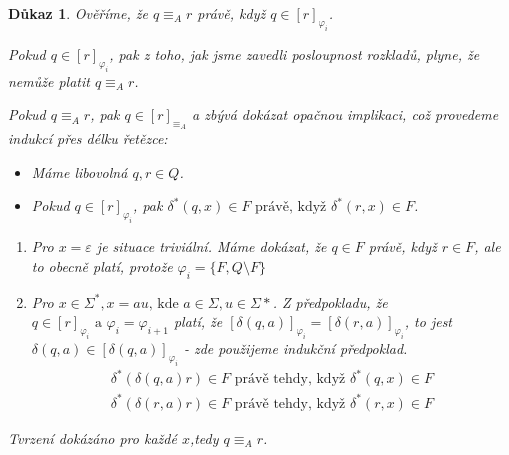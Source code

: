 \documentclass[10pt, a4paper, titlepage]{article}
\theoremstyle{note}
\newtheorem{dukaz}{Důkaz}
\begin{document}
\begin{dukaz}
Ověříme, že $q \equiv_{A} r$ právě, když $q \in [r]_{\varphi_{i}}$.

Pokud $q \in [r]_{\varphi_{i}}$, pak z toho, jak jsme zavedli
posloupnost rozkladů, plyne, že nemůže platit $q \equiv_{A} r$.

Pokud $q \equiv_{A} r$, pak $q \in [r]_{\equiv_{A}}$ a zbývá dokázat opačnou implikaci, což provedeme indukcí přes délku řetězce:
\begin{itemize}
\item
Máme libovolná $q, r \in Q$.

\item Pokud $q \in [r]_{\varphi_{i}}$, pak $\delta^{*}(q,x) \in F \text{ právě, když } \delta^{*}(r, x) \in F$.
\end{itemize}
\begin{enumerate}
\item
Pro $x = \varepsilon$ je situace triviální.
Máme dokázat, že $q \in F$ právě, když $r \in F$, ale to obecně platí, protože $\varphi_{i} = \lbrace F, Q \setminus F \rbrace$
\item
Pro $x \in \Sigma^{*}, x = au \text{, kde } a \in \Sigma, u \in \Sigma{*}$.
Z předpokladu, že $q \in [r]_{\varphi_{i}} \text{ a } \varphi_{i} =\varphi_{i+1}$ platí, že $[\delta(q, a)]_{\varphi_{i}} = [\delta(r, a)]_{\varphi_{i}}$,
to jest $\delta(q, a) \in [\delta(q, a)]_{\varphi_{i}}$ - zde použijeme indukční předpoklad.
\begin{gather*}
\delta^{*}(\delta(q,a)r) \in F \text{ pr\'avě tehdy, když } \delta^{*}(q,x) \in F \\
\delta^{*}(\delta(r,a)r) \in F \text{ pr\'avě tehdy, když } \delta^{*}(r,x) \in F
\end{gather*}
\end{enumerate}

Tvrzen\'i dok\'az\'ano pro každ\'e $x$,tedy $q \equiv_{A} r$.
\end{dukaz}
\end{document}
